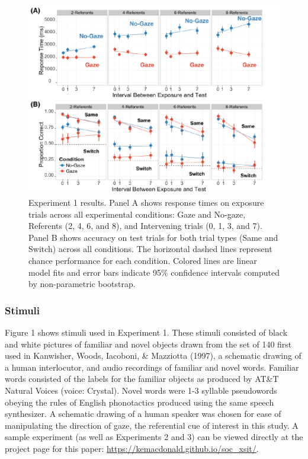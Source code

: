 \documentclass[a4paper,man,natbib]{apa6}
\newenvironment{CodeChunk}{}{}
\begin{document}
\begin{CodeChunk}
\begin{figure}
\includegraphics{figs/expt1-plot-1} \caption[Experiment 1 results]{Experiment 1 results. Panel A shows response times on exposure trials across all experimental conditions: Gaze and No-gaze, Referents (2, 4, 6, and 8), and Intervening trials (0, 1, 3, and 7). Panel B shows accuracy on test trials for both trial types (Same and Switch) across all conditions. The horizontal dashed lines represent chance performance for each condition. Colored lines are linear model fits and error bars indicate 95\% confidence intervals computed by non-parametric bootstrap.}\label{fig:expt1-plot}
\end{figure}
\end{CodeChunk}

\subsubsection{Stimuli}\label{stimuli}

Figure 1 shows stimuli used in Experiment 1. These stimuli consisted of
black and white pictures of familiar and novel objects drawn from the
set of 140 first used in Kanwisher, Woods, Iacoboni, \& Mazziotta
(1997), a schematic drawing of a human interlocutor, and audio
recordings of familiar and novel words. Familiar words consisted of the
labels for the familiar objects as produced by AT\&T Natural Voices
\texttrademark (voice: Crystal). Novel words were 1-3 syllable
pseudowords obeying the rules of English phonotactics produced using the
same speech synthesizer. A schematic drawing of a human speaker was
chosen for ease of manipulating the direction of gaze, the referential
cue of interest in this study. A sample experiment (as well as
Experiments 2 and 3) can be viewed directly at the project page for this
paper: \url{https://kemacdonald.github.io/soc_xsit/}.
\end{document}
